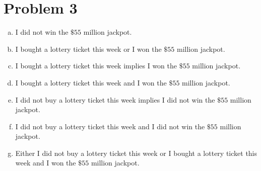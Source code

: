 \section*{Problem 3}


\begin{sol}
    \begin{enumerate}[(a)]
        \item I did not win the $\$55$ million jackpot.
        \item I bought a lottery ticket this week or I won the $\$55$ million jackpot.
        \item I bought a lottery ticket this week implies I won the $\$55$ million jackpot.
        \item I bought a lottery ticket this week and I won the $\$55$ million jackpot.
        \item I did not buy a lottery ticket this week implies I did not win the $\$55$ million jackpot.
        \item I did not buy a lottery ticket this week and I did not win the $\$55$ million jackpot.
        \item Either I did not buy a lottery ticket this week or I bought a lottery ticket this week and I won the $\$55$ million jackpot.
    \end{enumerate}
\end{sol}
\newpage